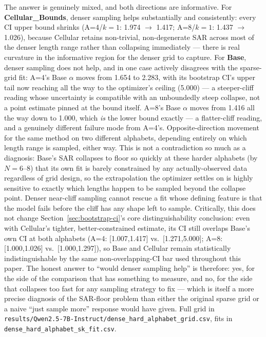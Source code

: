 \documentclass[11pt]{article}
\begin{document}
The answer is genuinely mixed, and both directions are informative. For \textbf{Cellular\_Bounds}, denser sampling helps substantially and consistently: every CI upper bound shrinks (A=4/$k=1$: 1.974 $\to$ 1.417; A=8/$k=1$: 1.437 $\to$ 1.026), because Cellular retains non-trivial, non-degenerate SAR across most of the denser length range rather than collapsing immediately --- there is real curvature in the informative region for the denser grid to capture. For \textbf{Base}, denser sampling does not help, and in one case actively disagrees with the sparse-grid fit: A=4's Base $\alpha$ moves from 1.654 to 2.283, with its bootstrap CI's upper tail now reaching all the way to the optimizer's ceiling (5.000) --- a steeper-cliff reading whose uncertainty is compatible with an unboundedly steep collapse, not a point estimate pinned at the bound itself. A=8's Base $\alpha$ moves from 1.416 all the way down to 1.000, which \emph{is} the lower bound exactly --- a flatter-cliff reading, and a genuinely different failure mode from A=4's. Opposite-direction movement for the same method on two different alphabets, depending entirely on which length range is sampled, either way. This is not a contradiction so much as a diagnosis: Base's SAR collapses to floor so quickly at these harder alphabets (by $N=6$--$8$) that its own fit is barely constrained by any actually-observed data regardless of grid design, so the extrapolation the optimizer settles on is highly sensitive to exactly which lengths happen to be sampled beyond the collapse point. Denser near-cliff sampling cannot rescue a fit whose defining feature is that the model fails before the cliff has any shape left to sample. Critically, this does not change Section~\ref{sec:bootstrap-ci}'s core distinguishability conclusion: even with Cellular's tighter, better-constrained estimate, its CI still overlaps Base's own CI at both alphabets (A=4: [1.007,1.417] vs.\ [1.271,5.000]; A=8: [1.000,1.026] vs.\ [1.000,1.297]), so Base and Cellular remain statistically indistinguishable by the same non-overlapping-CI bar used throughout this paper. The honest answer to ``would denser sampling help'' is therefore: yes, for the side of the comparison that has something to measure, and no, for the side that collapses too fast for any sampling strategy to fix --- which is itself a more precise diagnosis of the SAR-floor problem than either the original sparse grid or a naive ``just sample more'' response would have given. Full grid in \texttt{results/Qwen2.5-7B-Instruct/dense\_hard\_alphabet\_grid.csv}, fits in \texttt{dense\_hard\_alphabet\_sk\_fit.csv}.
\end{document}
